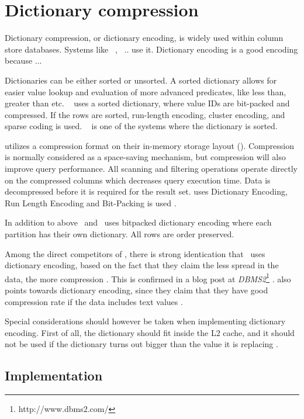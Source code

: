 \section{Dictionary compression}
\label{sec:Dictionary compression}
Dictionary compression, or dictionary encoding, is widely used within column store databases. Systems like \ibm~\cite{Raman2013-em}, \saph~\cite{Farber2012-vh}.. use it. Dictionary encoding is a good encoding because ... \ea~\cite{Faust2015-ke}

Dictionaries can be either sorted or unsorted. A sorted dictionary allows for easier value lookup and evaluation of more advanced predicates, like less than, greater than etc. \saph~\cite{Farber2012-vh} uses a sorted dictionary, where value IDs are bit-packed and compressed. If the rows are sorted, run-length encoding, cluster encoding, and sparse coding is used. \sapnw~\cite{Lemke2010-is} is one of the systems where the dictionary is sorted.

\oracle utilizes a compression format on their in-memory storage layout (\cite{Oracle2015-fs}). Compression is normally considered as a space-saving mechanism, but compression will also improve query performance. All scanning and filtering operations operate directly on the compressed columns which decreases query execution time. Data is decompressed before it is required for the result set. \oracle uses Dictionary Encoding, Run Length Encoding and Bit-Packing is used \cite{Oracle2015-fs}. 

In addition to above \ibm~and \blink~uses bitpacked dictionary encoding where each partition has their own dictionary. All rows are order preserved.

Among the direct competitors of \genusSoftware, there is strong identication that \qlikview~uses dictionary encoding, based on the fact that they claim the less spread in the data, the more compression \cite{Qlik2011-ef}. This is confirmed in a blog post at \textit{DBMS2}\footnote{http://www.dbms2.com/} \cite{noauthor_undated-js}. \tableau also points towards dictionary encoding, since they claim that they have good compression rate if the data includes text values \cite{Kamkolkar2015-iq}.

Special considerations should however be taken when implementing dictionary encoding. First of all, the dictionary should fit inside the L2 cache, and it should not be used if the dictionary turns out bigger than the value it is replacing \cite{Holloway2008-rr}. 

\subsection{Implementation}
\label{sub:Implementation}


